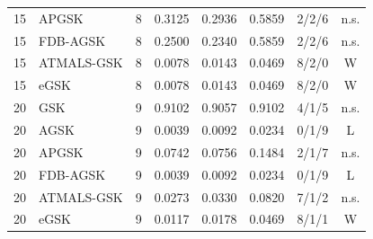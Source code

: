 \documentclass[algorithms,article,submit,moreauthors,pdftex]{Definitions/mdpi}
\begin{document}
\begin{table}[p]
\begin{tabular}{clcccccc}
15 & APGSK & 8 & 0.3125 & 0.2936 & 0.5859 & 2/2/6 & n.s. \\
15 & FDB-AGSK & 8 & 0.2500 & 0.2340 & 0.5859 & 2/2/6 & n.s. \\
15 & ATMALS-GSK & 8 & 0.0078 & 0.0143 & 0.0469 & 8/2/0 & W \\
15 & eGSK & 8 & 0.0078 & 0.0143 & 0.0469 & 8/2/0 & W \\
\midrule
20 & GSK & 9 & 0.9102 & 0.9057 & 0.9102 & 4/1/5 & n.s. \\
20 & AGSK & 9 & 0.0039 & 0.0092 & 0.0234 & 0/1/9 & L \\
20 & APGSK & 9 & 0.0742 & 0.0756 & 0.1484 & 2/1/7 & n.s. \\
20 & FDB-AGSK & 9 & 0.0039 & 0.0092 & 0.0234 & 0/1/9 & L \\
20 & ATMALS-GSK & 9 & 0.0273 & 0.0330 & 0.0820 & 7/1/2 & n.s. \\
20 & eGSK & 9 & 0.0117 & 0.0178 & 0.0469 & 8/1/1 & W \\
\bottomrule
\end{tabular}
\end{table}
\end{document}
